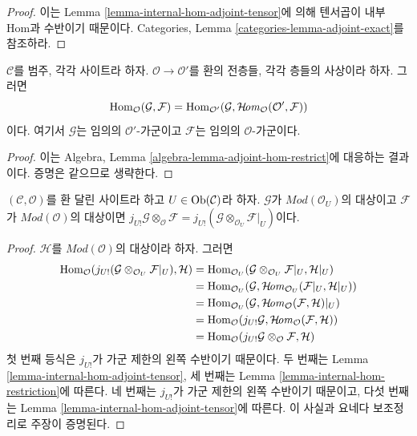 \begin{proof}
이는 Lemma \ref{lemma-internal-hom-adjoint-tensor}에 의해 텐서곱이 내부 Hom과
수반이기 때문이다. Categories, Lemma \ref{categories-lemma-adjoint-exact}를
참조하라.
\end{proof}

\begin{lemma}
\label{lemma-adjoint-hom-restrict}
$\mathcal{C}$를 범주, 각각 사이트라 하자. $\mathcal{O} \to \mathcal{O}'$를
환의 전층들, 각각 층들의 사상이라 하자. 그러면
$$
\mathop{\mathrm{Hom}}\nolimits_\mathcal{O}(\mathcal{G}, \mathcal{F}) =
\mathop{\mathrm{Hom}}\nolimits_{\mathcal{O}'}(\mathcal{G},
\mathop{\mathcal{H}\!\mathit{om}}\nolimits_\mathcal{O}(\mathcal{O}', \mathcal{F}))
$$
이다. 여기서 $\mathcal{G}$는 임의의 $\mathcal{O}'$-가군이고
$\mathcal{F}$는 임의의 $\mathcal{O}$-가군이다.
\end{lemma}

\begin{proof}
이는 Algebra, Lemma \ref{algebra-lemma-adjoint-hom-restrict}에 대응하는
결과이다. 증명은 같으므로 생략한다.
\end{proof}

\begin{lemma}
\label{lemma-j-shriek-and-tensor}
$(\mathcal{C}, \mathcal{O})$를 환 달린 사이트라 하고
$U \in \mathop{\mathrm{Ob}}\nolimits(\mathcal{C})$라 하자.
$\mathcal{G}$가 $\textit{Mod}(\mathcal{O}_U)$의 대상이고
$\mathcal{F}$가 $\textit{Mod}(\mathcal{O})$의 대상이면
$j_{U!}\mathcal{G} \otimes_\mathcal{O} \mathcal{F} =
j_{U!}(\mathcal{G} \otimes_{\mathcal{O}_U} \mathcal{F}|_U)$이다.
\end{lemma}

\begin{proof}
$\mathcal{H}$를 $\textit{Mod}(\mathcal{O})$의 대상이라 하자. 그러면
\begin{align*}
\mathop{\mathrm{Hom}}\nolimits_\mathcal{O}(j_{U!}(\mathcal{G} \otimes_{\mathcal{O}_U} \mathcal{F}|_U),
\mathcal{H})
& =
\mathop{\mathrm{Hom}}\nolimits_{\mathcal{O}_U}(\mathcal{G} \otimes_{\mathcal{O}_U} \mathcal{F}|_U,
\mathcal{H}|_U) \\
& =
\mathop{\mathrm{Hom}}\nolimits_{\mathcal{O}_U}(\mathcal{G},
\mathop{\mathcal{H}\!\mathit{om}}\nolimits_{\mathcal{O}_U}(\mathcal{F}|_U, \mathcal{H}|_U)) \\
& =
\mathop{\mathrm{Hom}}\nolimits_{\mathcal{O}_U}(\mathcal{G},
\mathop{\mathcal{H}\!\mathit{om}}\nolimits_\mathcal{O}(\mathcal{F}, \mathcal{H})|_U) \\
& =
\mathop{\mathrm{Hom}}\nolimits_\mathcal{O}(j_{U!}\mathcal{G},
\mathop{\mathcal{H}\!\mathit{om}}\nolimits_\mathcal{O}(\mathcal{F}, \mathcal{H})) \\
& =
\mathop{\mathrm{Hom}}\nolimits_\mathcal{O}(j_{U!}\mathcal{G} \otimes_\mathcal{O} \mathcal{F},
\mathcal{H})
\end{align*}
첫 번째 등식은 $j_{U!}$가 가군 제한의 왼쪽 수반이기 때문이다. 두 번째는
Lemma \ref{lemma-internal-hom-adjoint-tensor}, 세 번째는 Lemma
\ref{lemma-internal-hom-restriction}에 따른다. 네 번째는 $j_{U!}$가 가군
제한의 왼쪽 수반이기 때문이고, 다섯 번째는 Lemma
\ref{lemma-internal-hom-adjoint-tensor}에 따른다. 이 사실과 요네다 보조정리로
주장이 증명된다.
\end{proof}

